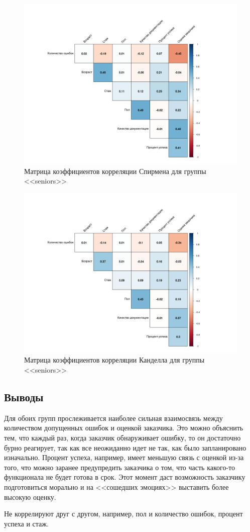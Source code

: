 \begin{figure}[H]
	\centering
	\includegraphics[width=\linewidth]{cor5}
	\caption{Матрица коэффициентов корреляции Спирмена для группы <<seniors>>}
	\label{cor5}
\end{figure}

\begin{figure}[H]
	\centering
	\includegraphics[width=\linewidth]{cor6}
	\caption{Матрица коэффициентов корреляции Канделла для группы <<seniors>>}
	\label{cor6}
\end{figure}


\subsection{Выводы}
Для обоих групп прослеживается наиболее сильная взаимосвязь между количеством допущенных ошибок и оценкой заказчика. Это можно объяснить тем, что каждый раз, когда заказчик обнаруживает ошибку, то он достаточно бурно реагирует, так как все неожиданно идет не так, как было запланировано изначально. Процент успеха, например, имеет меньшую связь с оценкой из-за того, что можно заранее предупредить заказчика о том, что часть какого-то функционала не будет готова в срок. Этот момент даст возможность заказчику подготовиться морально и на <<сошедших эмоциях>> выставить более высокую оценку.

Не коррелируют друг с другом, например, пол и количество ошибок, процент успеха и стаж.
